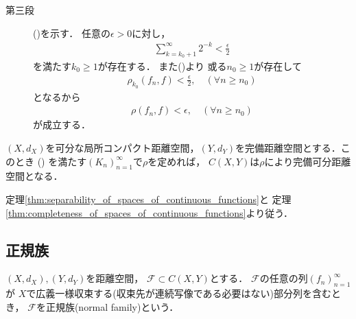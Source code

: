 \begin{prf}
\begin{description}
			\item[第三段]
				()を示す．
				任意の$\epsilon > 0$に対し，
				\begin{align}
					\sum_{k=k_0+1}^\infty 2^{-k} < \frac{\epsilon}{2}
				\end{align}
				を満たす$k_0 \geq 1$が存在する．
				また()より
				或る$n_0 \geq 1$が存在して
				\begin{align}
					\rho_{k_0}(f_n,f) < \frac{\epsilon}{2},
					\quad (\forall n \geq n_0)
				\end{align}
				となるから
				\begin{align}
					\rho(f_n,f) < \epsilon, \quad (\forall n \geq n_0)
				\end{align}
				が成立する．
				\QED
		\end{description}
	\end{prf}
	
	\begin{screen}
		\begin{thm}[$C(X,Y)$の完備可分性]\label{thm:appendix_complete_separability_of_spaces_of_continuous_functions}
			$(X,d_X)$を可分な局所コンパクト距離空間，$(Y,d_Y)$を完備距離空間とする．このとき
			()
			を満たす$(K_n)_{n=1}^\infty$で$\rho$を定めれば，
			$C(X,Y)$は$\rho$により完備可分距離空間となる．
		\end{thm}
	\end{screen}
	
	\begin{prf}
		定理\ref{thm:separability_of_spaces_of_continuous_functions}と
		定理\ref{thm:completeness_of_spaces_of_continuous_functions}より従う．
		\QED
	\end{prf}

\subsection{正規族}
	\begin{screen}
		\begin{dfn}[正規族]
			$(X,d_X),(Y,d_Y)$を距離空間，
			$\mathscr{F} \subset C(X,Y)$とする．
			$\mathscr{F}$の任意の列$(f_n)_{n=1}^\infty$が
			$X$で広義一様収束する(収束先が連続写像である必要はない)部分列を含むとき，
			$\mathscr{F}$を正規族(normal family)という．
		\end{dfn}
	\end{screen}
	

